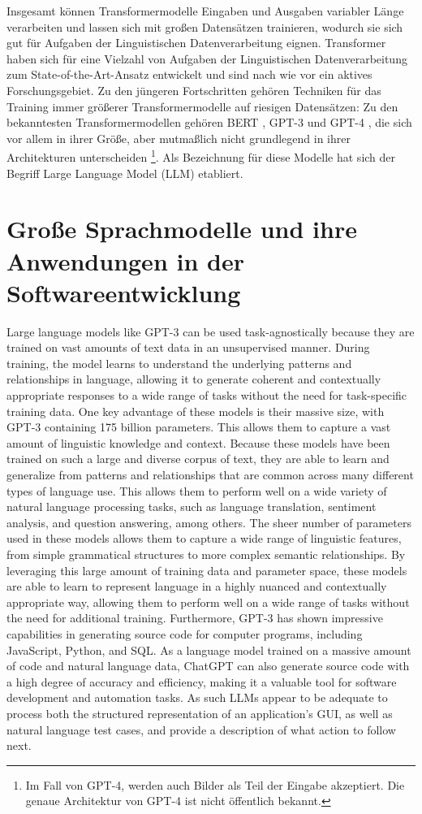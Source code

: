Insgesamt können Transformermodelle Eingaben und Ausgaben variabler Länge verarbeiten und lassen sich mit großen Datensätzen trainieren, wodurch sie sich gut für Aufgaben der Linguistischen Datenverarbeitung eignen.
Transformer haben sich für eine Vielzahl von Aufgaben der Linguistischen Datenverarbeitung zum State-of-the-Art-Ansatz entwickelt und sind nach wie vor ein aktives Forschungsgebiet.
Zu den jüngeren Fortschritten gehören Techniken für das Training immer größerer Transformermodelle auf riesigen Datensätzen:
Zu den bekanntesten Transformermodellen gehören BERT \cite{bert}, GPT-3 \cite{FewShotLearners} und GPT-4 \cite{gpt4}, die sich vor allem in ihrer Größe, aber mutmaßlich nicht grundlegend in ihrer Architekturen unterscheiden \footnote{Im Fall von GPT-4, werden auch Bilder als Teil der Eingabe akzeptiert. Die genaue Architektur von GPT-4 ist nicht öffentlich bekannt.}.
Als Bezeichnung für diese Modelle hat sich der Begriff Large Language Model (LLM) etabliert.

\section{Große Sprachmodelle und ihre Anwendungen in der Softwareentwicklung}
\label{subsec:Foundations:LLM}

Large language models like GPT-3 can be used task-agnostically because they are trained on vast amounts of text data in an unsupervised manner. During training, the model learns to understand the underlying patterns and relationships in language, allowing it to generate coherent and contextually appropriate responses to a wide range of tasks without the need for task-specific training data.
One key advantage of these models is their massive size, with GPT-3 containing 175 billion parameters.
This allows them to capture a vast amount of linguistic knowledge and context.
Because these models have been trained on such a large and diverse corpus of text, they are able to learn and generalize from patterns and relationships that are common across many different types of language use. This allows them to perform well on a wide variety of natural language processing tasks, such as language translation, sentiment analysis, and question answering, among others.
The sheer number of parameters used in these models allows them to capture a wide range of linguistic features, from simple grammatical structures to more complex semantic relationships. By leveraging this large amount of training data and parameter space, these models are able to learn to represent language in a highly nuanced and contextually appropriate way, allowing them to perform well on a wide range of tasks without the need for additional training.
Furthermore, GPT-3 has shown impressive capabilities in generating source code for computer programs, including JavaScript, Python, and SQL. As a language model trained on a massive amount of code and natural language data, ChatGPT can also generate source code with a high degree of accuracy and efficiency, making it a valuable tool for software development and automation tasks.
As such LLMs appear to be adequate to process both the structured representation of an application’s GUI, as well as natural language test cases, and provide a description of what action to follow next.

